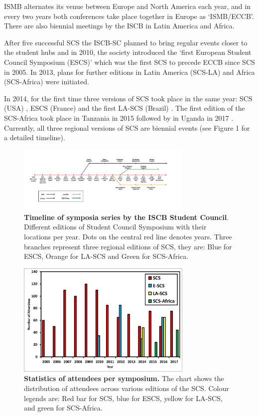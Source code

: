 \documentclass[]{article}%
\begin{document}
	ISMB alternates its venue between Europe and North America each year, and in every two years both conferences take place together in Europe as `ISMB/ECCB'. There are also biennial meetings by the ISCB in Latin America and Africa. 
	
	After five successful SCS the ISCB-SC planned to bring regular events closer to the student hubs and in 2010, the society introduced the `first European Student Council Symposium (ESCS)' \citep{Moreau2010} which was the first SCS to precede ECCB since SCS in 2005. In 2013, plans for further editions in Latin America (SCS-LA) and Africa (SCS-Africa) were initiated.
	
	In 2014, for the first time three versions of SCS took place in the same year: SCS (USA) \citep{Rahman2015}, ESCS (France) \citep{Francescatto2015} and the first LA-SCS  (Brazil) \citep{Parra2015}. The first edition of the SCS-Africa took place in Tanzania in 2015 \citep{souilmi2015} followed by in Uganda in 2017 \citep{rafael2017}. Currently, all three regional versions of SCS are biennial events (see Figure 1 for a detailed timeline). \\
	
	\begin{figure}
		\centering
		\includegraphics[width=0.75\textwidth]{figure1.pdf}
		\caption{\textbf{Timeline of symposia series by the ISCB Student Council}. Different editions of Student
Council Symposium with their locations per year. Dots on the central red line denotes years.
Three branches represent three regional editions of SCS, they are: Blue for ESCS, Orange for
LA-SCS and Green for SCS-Africa.
		}
	\end{figure}
	
	\begin{figure}
		\centering
		\includegraphics[width=0.75\textwidth]{figure2.pdf}
		\caption{\textbf{Statistics of attendees per symposium.}
			The chart shows the distribution of attendees across various editions of the SCS. Colour legends are: Red bar for SCS, blue for ESCS, yellow for LA-SCS, and  green for SCS-Africa.
		}
	\end{figure}
	
\end{document}
